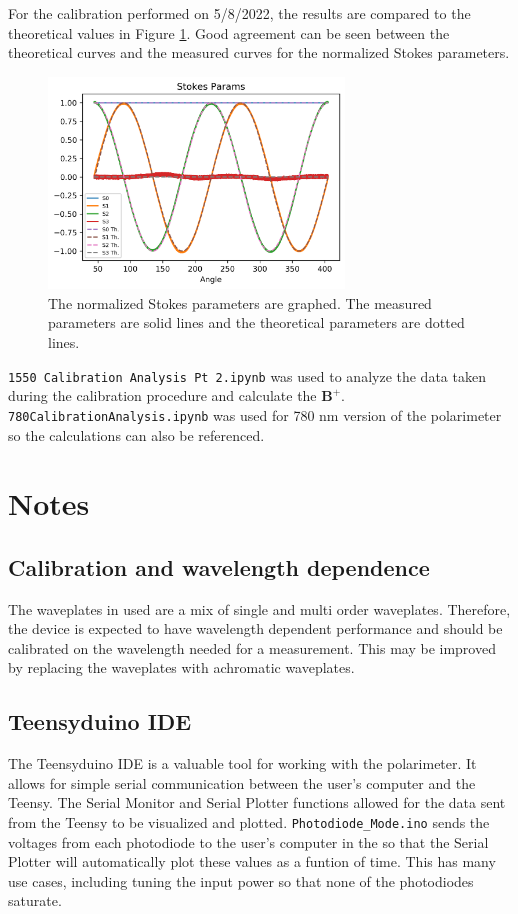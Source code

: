 \documentclass{article}
\begin{document}
For the calibration performed on 5/8/2022, the results are compared to the theoretical values in Figure \ref{calibration Data}. Good agreement can be seen between the theoretical curves and the measured curves for the normalized Stokes parameters. 
\begin{figure}[!h]
\begin{center}
\includegraphics[width=0.7\textwidth]{refs_figures/Calibration Data.png}
\end{center}
\caption{The normalized Stokes parameters are graphed. The measured parameters are solid lines and the theoretical parameters are dotted lines.}
\label{calibration Data}
\end{figure}

\verb|1550 Calibration Analysis Pt 2.ipynb| was used to analyze the data taken during the calibration procedure and calculate the $\textbf{B}^{+}$. \verb|780CalibrationAnalysis.ipynb| was used for 780 nm version of the polarimeter so the calculations can also be referenced. 

\section{Notes}
\subsection{Calibration and wavelength dependence}
The waveplates in used are a mix of single and multi order waveplates. Therefore, the device is expected to have wavelength dependent performance and should be calibrated on the wavelength needed for a measurement. This may be improved by replacing the waveplates with achromatic waveplates. 
\subsection{Teensyduino IDE}
The Teensyduino IDE is a valuable tool for working with the polarimeter. It allows for simple serial communication between the user's computer and the Teensy. The Serial Monitor and Serial Plotter functions allowed for the data sent from the Teensy to be visualized and plotted. \verb|Photodiode_Mode.ino| sends the voltages from each photodiode to the user's computer in the so that the Serial Plotter will automatically plot these values as a funtion of time. This has many use cases, including tuning the input power so that none of the photodiodes saturate.
\end{document}
